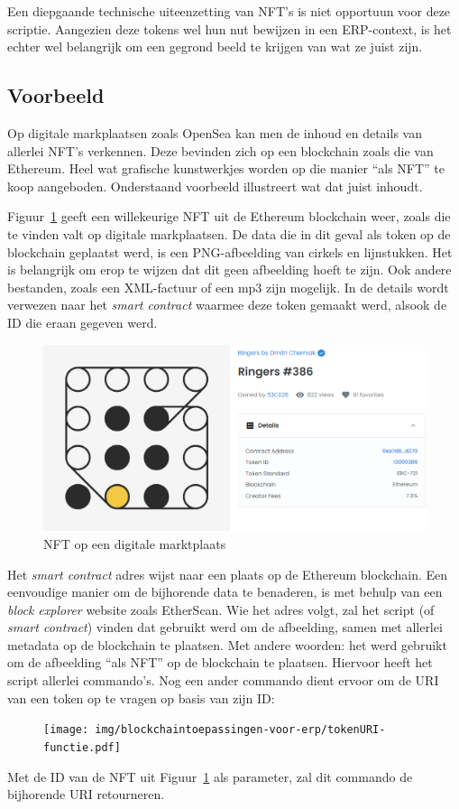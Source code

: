 Een diepgaande technische uiteenzetting van NFT's is niet opportuun voor deze scriptie. Aangezien deze tokens wel hun nut bewijzen in een ERP-context, is het echter wel belangrijk om een gegrond beeld te krijgen van wat ze juist zijn.

\subsection{Voorbeeld}
\label{sub:voorbeeld}

Op digitale markplaatsen zoals OpenSea kan men de inhoud en details van allerlei NFT's verkennen. Deze bevinden zich op een blockchain zoals die van Ethereum. Heel wat grafische kunstwerkjes worden op die manier ``als NFT'' te koop aangeboden. Onderstaand voorbeeld illustreert wat dat juist inhoudt.

Figuur~\ref{fig:nft-example} geeft een willekeurige NFT uit de Ethereum blockchain weer, zoals die te vinden valt op digitale markplaatsen. De data die in dit geval als token op de blockchain geplaatst werd, is een PNG-afbeelding van cirkels en lijnstukken. Het is belangrijk om erop te wijzen dat dit geen afbeelding hoeft te zijn. Ook andere bestanden, zoals een XML-factuur of een mp3 zijn mogelijk. In de details wordt verwezen naar het \textit{smart contract} waarmee deze token gemaakt werd, alsook de ID die eraan gegeven werd.

\begin{figure}[H]
	\centering
	\includegraphics[width=\linewidth]{img/blockchaintoepassingen-voor-erp/nft-voorbeeld.png}
	\caption{\label{fig:nft-example}NFT op een digitale marktplaats}
\end{figure}

Het \textit{smart contract} adres wijst naar een plaats op de Ethereum blockchain. Een eenvoudige manier om de bijhorende data te benaderen, is met behulp van een \textit{block explorer} website zoals EtherScan. Wie het adres volgt, zal het script (of \textit{smart contract}) vinden dat gebruikt werd om de afbeelding, samen met allerlei metadata op de blockchain te plaatsen. Met andere woorden: het werd gebruikt om de afbeelding ``als NFT'' op de blockchain te plaatsen. Hiervoor heeft het script allerlei commando's. Nog een ander commando dient ervoor om de URI van een token op te vragen op basis van zijn ID:
\begin{figure}[H]
	\centering
	\texttt{[image: img/blockchaintoepassingen-voor-erp/tokenURI-functie.pdf]}
\end{figure}
Met de ID van de NFT uit Figuur~\ref{fig:nft-example} als parameter, zal dit commando de bijhorende URI retourneren.


